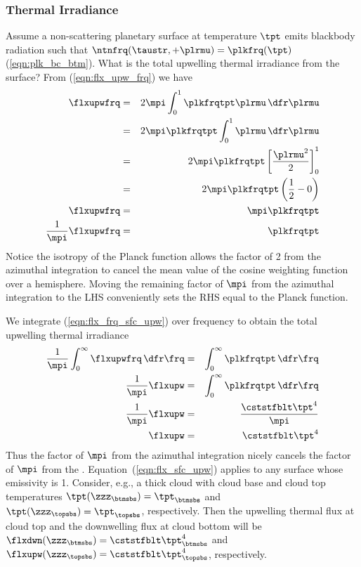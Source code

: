 \documentclass[12pt]{article}
\begin{document}
\subsubsection[Thermal Irradiance]{Thermal Irradiance}\label{sxn:thr}
Assume a non-scattering planetary surface at temperature $\tpt$ emits
blackbody radiation such that $\ntnfrq(\taustr,+\plrmu) =
\plkfrq(\tpt)$ (\ref{eqn:plk_bc_btm}).   
What is the total upwelling thermal irradiance from the surface? 
From (\ref{eqn:flx_upw_frq}) we have
\begin{eqnarray}
\flxupwfrq 
& = & 2 \mpi \int_{0}^{1} \plkfrqtpt \plrmu \, \dfr\plrmu \nonumber \\
& = & 2 \mpi \plkfrqtpt \int_{0}^{1} \plrmu \,\dfr\plrmu \nonumber \\
& = & 2 \mpi \plkfrqtpt \left[ \frac{\plrmu^{2}}{2} \right]_{0}^{1} \nonumber \\
& = & 2 \mpi \plkfrqtpt \left( \frac{1}{2} - 0 \right) \nonumber \\
\flxupwfrq & = & \mpi \plkfrqtpt \nonumber \\
\frac{1}{\mpi} \flxupwfrq & = & \plkfrqtpt 
\label{eqn:flx_frq_sfc_upw}
\end{eqnarray} 
Notice the isotropy of the Planck function allows the factor of 2 from
the azimuthal integration to cancel the mean value of the cosine
weighting function over a hemisphere. 
Moving the remaining factor of $\mpi$ from the azimuthal integration to
the LHS conveniently sets the RHS equal to the Planck function.

We integrate (\ref{eqn:flx_frq_sfc_upw}) over frequency to obtain the
total upwelling thermal irradiance
\begin{eqnarray}
\frac{1}{\mpi} \int_{0}^{\infty} \flxupwfrq  \,\dfr\frq & = &
\int_{0}^{\infty} \plkfrqtpt \,\dfr\frq \nonumber \\ 
\frac{1}{\mpi} \flxupw & = & \int_{0}^{\infty} \plkfrqtpt \,\dfr\frq
\nonumber \\ 
\frac{1}{\mpi} \flxupw & = & \frac{\cststfblt \tpt^{4}}{\mpi} \nonumber \\ 
\flxupw & = & \cststfblt \tpt^{4}
\label{eqn:flx_sfc_upw}
\end{eqnarray} 
Thus the factor of $\mpi$ from the azimuthal integration nicely cancels
the factor of $\mpi$ from the .
Equation~(\ref{eqn:flx_sfc_upw}) applies to any surface whose
emissivity is 1. 
Consider, e.g., a thick cloud with cloud base and cloud top
temperatures $\tpt(\zzz_{\btmsbs}) = \tpt_{\btmsbs}$  and
$\tpt(\zzz_{\topsbs}) = \tpt_{\topsbs}$, respectively.  
Then the upwelling thermal flux at cloud top and the downwelling flux
at cloud bottom will be $\flxdwn(\zzz_{\btmsbs}) = \cststfblt \tpt_{\btmsbs}^{4}$
and $\flxupw(\zzz_{\topsbs}) = \cststfblt \tpt_{\topsbs}^{4}$, respectively.
\end{document}
